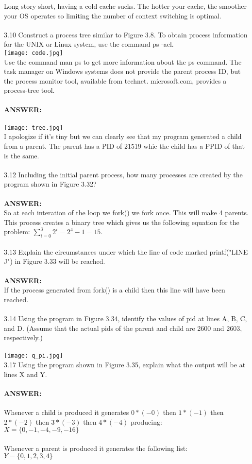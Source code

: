 \documentclass[12pt]{article}
\begin{document}
\noindent Long story short, having a cold cache sucks. The hotter your cache, the smoother 
your OS operates so limiting the number of context switching is optimal.\\\\
3.10 Construct a process tree similar to Figure 3.8. To obtain process information
for the UNIX or Linux system, use the command ps -ael.\\
\texttt{[image: code.jpg]}\\
Use the command man ps to get more information about the ps command.
The task manager on Windows systems does not provide the
parent process ID, but the process monitor tool, available from technet.
microsoft.com, provides a process-tree tool.\\\\
\textbf{ANSWER: }\\\\
\texttt{[image: tree.jpg]}\\
I apologize if it's tiny but we can clearly see that my program generated a child 
from a parent. The parent has a PID of 21519 whie the child has a PPID of that is 
the same. \\\\
3.12 Including the initial parent process, how many processes are created by
the program shown in Figure 3.32?\\\\
\textbf{ANSWER: }\\
So at each interation of the loop we fork() we fork once. This will make 4
parents. This process creates a binary tree which gives us the following 
equation for the problem: $\sum\limits_{i=0}^{3}{2^i}=2^4-1=15$. \\\\
3.13 Explain the circumstances under which the line of code marked
printf("LINE J") in Figure 3.33 will be reached.\\\\
\textbf{ANSWER: }\\
If the process generated from fork() is a child then this line will have been 
reached.\\\\
3.14 Using the program in Figure 3.34, identify the values of pid at lines A, B,
C, and D. (Assume that the actual pids of the parent and child are 2600
and 2603, respectively.)\\\\
\texttt{[image: q\_pi.jpg]}\\
3.17 Using the program shown in Figure 3.35, explain what the output will
be at lines X and Y.\\\\
\textbf{ANSWER: }\\\\
Whenever a child is produced it generates $0*(-0)$ then $1*(-1)$ then $2*(-2)$ 
then $3*(-3)$ then $4*(-4)$ producing:\\ 
$X = \{0, -1, -4, -9, -16\}$\\\\
Whenever a parent is produced it generates the following list:\\
$Y = \{0, 1, 2, 3, 4\}$\\
\end{document}
